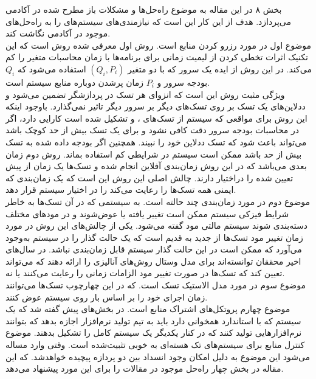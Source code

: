 \documentclass[a4paper, 12pt]{article}
\begin{document}
بخش ۸ در این مقاله به موضوع راه‌حل‌ها و مشکلات باز مطرح شده در آکادمی می‌پردازد.
هدف از این کار این است که نیازمندی‌های سیستم‌های
را به راه‌حل‌های موجود در آکادمی نگاشت کند. \\
موضوع اول در مورد رزرو کردن منابع است.
روش اول معرفی شده روش
است که این تکنیک اثرات تخطی کردن از لیمیت زمانی برای برنامه‌ها با زمان محاسبات متغیر را کم می‌کند.
در این روش از ایده یک سرور که با دو متغیر
$(Q_i,P_i)$
استفاده می‌شود که
$Q_i$
بودجه سرور و
$P_i$
زمان پرشدن دوباره منابع سیستم است. \\
ویژگی مثبت روش این است که انزوای هر تسک در پردازشگر تضمین می‌شود و ددلاین‌های یک تسک
بر روی تسک‌های دیگر بر سرور دیگر تاثیر نمی‌گذارد.
باوجود اینکه این روش برای مواقعی که سیستم از تسک‌های
، و 
تشکیل شده است کارایی دارد، اگر در محاسبات بودجه سرور دقت کافی نشود و برای یک تسک بیش
از حد کوچک باشد می‌تواند باعث شود که تسک ددلاین خود را نبیند.
همچنین اگر بودجه داده شده به تسک بیش از حد باشد ممکن است سیستم در شرایطی کم استفاده بماند.
روش دوم زمان بعدی
می‌باشد که در این روش زمان‌بندی آفلاین انجام شده و تسک‌ها یک زمان از پیش تعیین شده را دراختیار
دارند. چالش اصلی این روش این است که یک زمان‌بندی که ایمنی همه تسک‌ها را رعایت می‌کند
را در اختیار سیستم قرار دهد. \\
موضوع دوم در مورد زمان‌بندی چند حالته است.
به سیستمی که در آن تسک‌ها به خاطر شرایط فیزکی سیستم ممکن است تغییر یافته یا عوض‌شوند و در
مود‌‌های مختلف دسته‌بندی شوند سیستم مالتی مود گفته می‌شود.
یکی از چالش‌های این روش در مورد زمان تغییر مود تسک‌ها از جدید به قدیم است
که یک حالت گذار را در سیستم به‌وجود می‌آورد که ممکن است در این حالت گذار سیستم قابل زمان‌بندی
نباشد.
در سال‌های اخیر محققان توانسته‌اند برای مدل وستال روش‌های آنالیزی را ارائه دهند که می‌تواند
تعیین کند که تسک‌ها در صورت تغییر مود الزامات زمانی را رعایت می‌کنند یا نه. \\
موضوع سوم در مورد مدل الاستیک تسک است.
که در این چهارچوب تسک‌ها می‌توانند زمان اجرای خود را بر اساس بار روی سیستم عوض کنند. \\
موضوع چهارم پروتکل‌های اشتراک منابع است.
در بخش‌های پیش گفته شد که یک سیستم
که با استاندارد همخوانی دارد باید به تیم تولید نرم‌افزار اجازه بدهد که بتوانند نرم‌افزار‌هایی تولید کنند
که در کنار یکدیگر یک سیستم کامل را تشکیل بدهند.
موضوع کنترل منابع برای سیستم‌های تک هسته‌ای به خوبی تثبیت‌شده است. وقتی
وارد مساله می‌شود این موضوع به‌ دلیل امکان وجود انسداد بین دو پردازه پیچیده خواهد‌شد.
که این مقاله در بخش  چهار راه‌حل موجود در مقالات را برای این مورد پیشنهاد می‌دهد. \\
\end{document}
